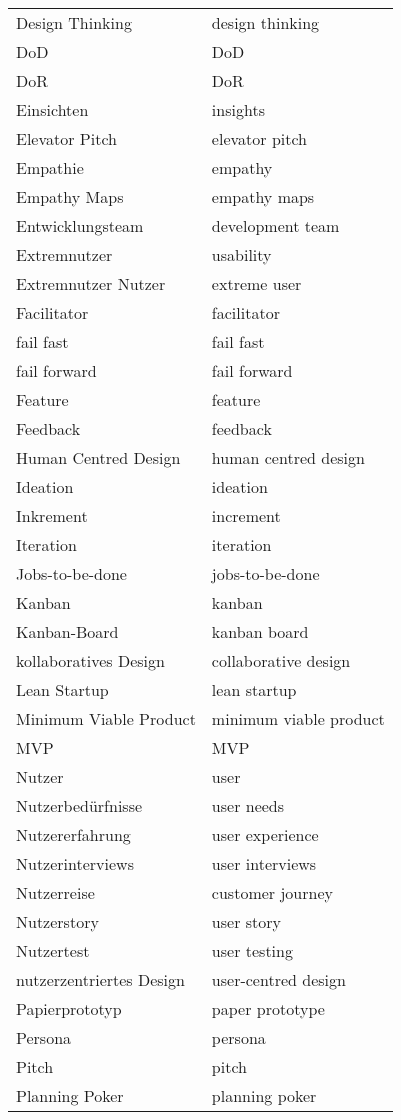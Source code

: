 \documentclass[a4paper]{article}
\begin{document}
\begin{longtable}{ p{5cm} p{5cm}}
Design Thinking	&	design thinking\\
DoD	&	DoD\\
DoR	&	DoR\\
Einsichten	&	insights\\
Elevator Pitch	&	elevator pitch\\
Empathie	&	empathy\\
Empathy Maps	&	empathy maps\\
Entwicklungsteam	&	development team\\
Extremnutzer	&	usability\\
Extremnutzer Nutzer	&	extreme user\\
Facilitator	&	facilitator\\
fail fast	&	fail fast\\
fail forward	&	fail forward\\
Feature	&	feature\\
Feedback	&	feedback\\
Human Centred Design	&	human centred design\\
Ideation	&	ideation\\
Inkrement	&	increment\\
Iteration	&	iteration\\
Jobs-to-be-done	&	jobs-to-be-done\\
Kanban	&	kanban\\
Kanban-Board	&	kanban board\\
kollaboratives Design	&	collaborative design\\
Lean Startup	&	lean startup\\
Minimum Viable Product	&	minimum viable product\\
MVP	&	MVP\\
Nutzer	&	user\\
Nutzerbedürfnisse	&	user needs\\
Nutzererfahrung	&	user experience\\
Nutzerinterviews	&	user interviews\\
Nutzerreise	&	customer journey\\
Nutzerstory	&	user story\\
Nutzertest	&	user testing\\
nutzerzentriertes Design	&	user-centred design\\
Papierprototyp	&	paper prototype\\
Persona	&	persona\\
Pitch	&	pitch\\
Planning Poker	&	planning poker\\

\end{longtable}
\end{document}
